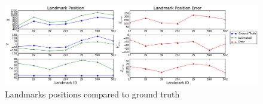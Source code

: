\begin{figure}[h]
\centering
\includegraphics[width=17cm, keepaspectratio=true]
{./Figures/fltfig/airport/Figure20.png}
\caption{Landmarks positions compared to ground truth}
\label{fltfig:15}
\end{figure}

